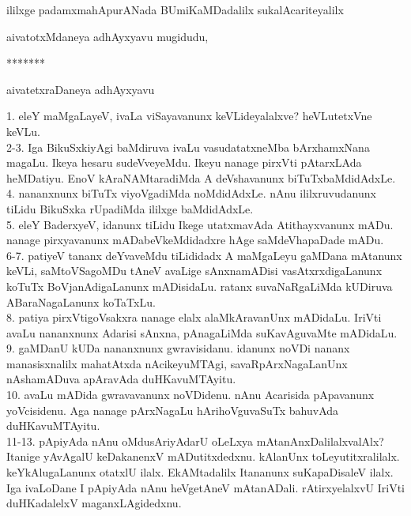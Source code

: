 \documentclass{article}
\begin{document}
\begin{center}
ililxge padamxmahApurANada BUmiKaMDadalilx sukalAcariteyalilx
\end{center}

\begin{center}
aivatotxMdaneya adhAyxyavu mugidudu,
\end{center}

\begin{center}
*******
\end{center}

\begin{center}
aivatetxraDaneya adhAyxyavu
\end{center}

1. eleY maMgaLayeV, ivaLa viSayavanunx keVLideyalalxve? heVLutetxVne keVLu.\\
2-3. Iga BikuSxkiyAgi baMdiruva ivaLu vasudatatxneMba bArxhamxNana magaLu. Ikeya hesaru sudeVveyeMdu. Ikeyu nanage pirxVti pAtarxLAda heMDatiyu. EnoV kAraNAMtaradiMda A deVshavanunx biTuTxbaMdidAdxLe.\\
4. nananxnunx biTuTx viyoVgadiMda noMdidAdxLe. nAnu ililxruvudanunx tiLidu BikuSxka rUpadiMda ililxge baMdidAdxLe.\\
5. eleY BaderxyeV, idanunx tiLidu Ikege utatxmavAda Atithayxvanunx mADu. nanage pirxyavanunx mADabeVkeMdidadxre hAge saMdeVhapaDade mADu.\\
6-7. patiyeV tananx deYvaveMdu tiLididadx A maMgaLeyu gaMDana mAtanunx keVLi, saMtoVSagoMDu tAneV avaLige sAnxnamADisi vasAtxrxdigaLanunx koTuTx BoVjanAdigaLanunx mADisidaLu. ratanx suvaNaRgaLiMda kUDiruva ABaraNagaLanunx koTaTxLu.\\
8. patiya pirxVtigoVsakxra nanage elalx alaMkAravanUnx mADidaLu. IriVti avaLu nananxnunx Adarisi sAnxna, pAnagaLiMda suKavAguvaMte mADidaLu.\\
9. gaMDanU kUDa nananxnunx gwravisidanu. idanunx noVDi nananx manasisxnalilx mahatAtxda nAcikeyuMTAgi, savaRpArxNagaLanUnx nAshamADuva apAravAda duHKavuMTAyitu.\\
10. avaLu mADida gwravavanunx noVDidenu. nAnu Acarisida pApavanunx yoVcisidenu. Aga nanage pArxNagaLu hArihoVguvaSuTx bahuvAda duHKavuMTAyitu.\\
11-13. pApiyAda nAnu oMdusAriyAdarU oLeLxya mAtanAnxDalilalxvalAlx? Itanige yAvAgalU keDakanenxV mADutitxdedxnu. kAlanUnx toLeyutitxralilalx. keYkAlugaLanunx otatxlU ilalx. EkAMtadalilx Itananunx suKapaDisaleV ilalx. Iga ivaLoDane I pApiyAda nAnu heVgetAneV mAtanADali. rAtirxyelalxvU IriVti duHKadalelxV maganxLAgidedxnu.\\
\end{document}
